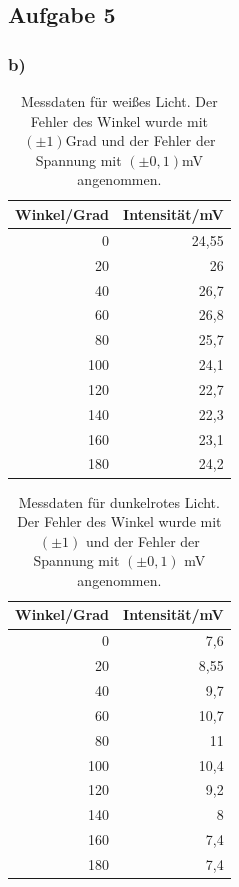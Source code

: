 \documentclass[12pt]{scrartcl}
\begin{document}
\subsection{Aufgabe 5}

\subsubsection{b)}

\begin{table}[htbp]
\caption{Messdaten für weißes Licht. Der Fehler des Winkel wurde mit $(\pm 1)$Grad und der Fehler der Spannung mit $(\pm 0,1)$mV angenommen.}
\begin{center}
\begin{tabular}{|r|r|}
\hline
\multicolumn{1}{|l|}{Winkel/Grad} & \multicolumn{1}{l|}{Intensität/mV} \\ \hline
0 & 24,55 \\ \hline
20 & 26 \\ \hline
40 & 26,7 \\ \hline
60 & 26,8 \\ \hline
80 & 25,7 \\ \hline
100 & 24,1 \\ \hline
120 & 22,7 \\ \hline
140 & 22,3 \\ \hline
160 & 23,1 \\ \hline
180 & 24,2 \\ \hline
\end{tabular}
\end{center}
\label{tab:a_5_b_w}
\end{table}


\begin{table}[htbp]
\caption{Messdaten für dunkelrotes Licht. Der Fehler des Winkel wurde mit $(\pm 1)$ und der Fehler der Spannung mit $(\pm 0,1)$ mV angenommen.}
\begin{center}
\begin{tabular}{|r|r|}
\hline
\multicolumn{1}{|l|}{Winkel/Grad} & \multicolumn{1}{l|}{Intensität/mV} \\ \hline
0 & 7,6 \\ \hline
20 & 8,55 \\ \hline
40 & 9,7 \\ \hline
60 & 10,7 \\ \hline
80 & 11 \\ \hline
100 & 10,4 \\ \hline
120 & 9,2 \\ \hline
140 & 8 \\ \hline
160 & 7,4 \\ \hline
180 & 7,4 \\ \hline
\end{tabular}
\end{center}
\label{tab:a_5_b_dr}
\end{table}
\end{document}
